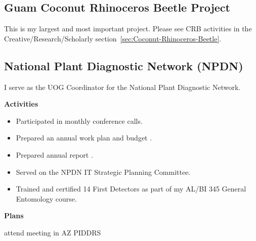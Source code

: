 \documentclass[12pt,english]{scrartcl}
\newcommand{\activities}{\medskip\textbf{Activities}}
\newcommand{\plans}{\medskip\textbf{Plans}}
\begin{document}
\subsection{Guam Coconut Rhinoceros Beetle Project}

This is my largest and most important project. Please see CRB activities in the Creative/Research/Scholarly section~\ref{sec:Coconut-Rhinoceros-Beetle}.

\subsection{National Plant Diagnostic Network (NPDN)}
\begin{refsection}
	
I serve as the UOG Coordinator for the National Plant Diagnostic Network. 

\activities

\begin{itemize}
\item Participated in monthly conference calls.
\item Prepared an annual work plan and budget \cite{moore_university_2018}.
\item Prepared annual report \cite{moore_npdn_2018}.
\item Served on the NPDN IT Strategic Planning Committee.
\item Trained and certified 14 First Detectors as part of my AL/BI 345 General
Entomology course.
\end{itemize}

\plans

attend meeting in AZ
PIDDRS

\printbibliography

\end{refsection}	
\end{document}
